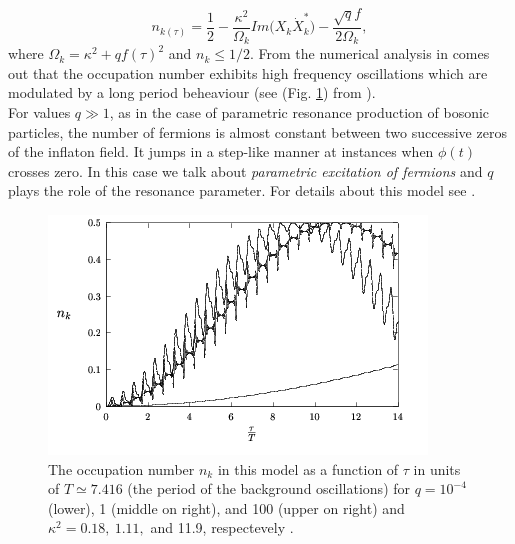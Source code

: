 \documentclass[11pt,a4paper,twoside]{book}
\begin{document}
\begin{equation}
\label{Chap4:OtherModels_OccupationNumberFermion}
n_{k(\tau)}=\frac{1}{2} - \frac{\kappa^{2}}{\Omega_{k}}Im\Bigg(X_{k}\dot{X}_{k}^{*}\Bigg) - \frac{\sqrt{q}f}{2\Omega_{k}},
\end{equation}
where $\Omega_{k}=\kappa^{2} + qf(\tau)^{2}$ and $ n_{k}\le 1/2 $. From the numerical analysis in \cite{Chap4:FermionPreheating} comes out that the occupation number exhibits high frequency oscillations which are modulated by  a long period beheaviour (see (Fig. \ref{fig:fermionicpreheating}) from \cite{Chap4:FermionPreheating}). \\
For values $ q \gg 1 $, as in the case of parametric resonance production of bosonic particles, the number of fermions is almost constant between two successive zeros of the inflaton field. It jumps in a step-like manner at instances when $\phi(t)$ crosses zero. In this case we talk about \textit{parametric excitation of fermions} and $ q $ plays the role of the resonance parameter. For details about this model see \cite{Chap4:FermionPreheating}.
\begin{figure}
	\centering
	\includegraphics[width=0.7\linewidth, height=0.3\textheight]{Images/Chap4/FermionicPreheating}
	\caption{The occupation number $ n_{k} $ in this model as a function of $ \tau $ in units of $ T\simeq 7.416 $ (the period of the background oscillations) for $ q=10^{-4} $ (lower), 1 (middle on right), and 100 (upper on right) and $ \kappa^{2} = 0.18,\ 1.11, $ and 11.9, respectevely \cite{Chap4:FermionPreheating}.}
	\label{fig:fermionicpreheating}
\end{figure}
\end{document}
